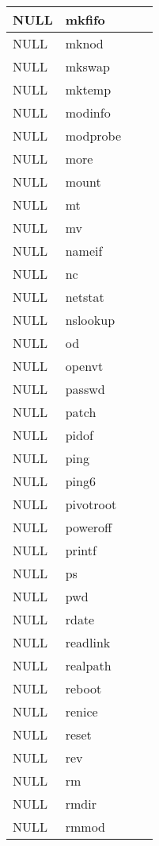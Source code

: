 \begin{longtable}{llp{60mm}p{60mm}}
     \hline
      NULL& mkfifo \\
     \hline
      NULL& mknod \\
     \hline
      NULL& mkswap \\
     \hline
      NULL& mktemp \\
     \hline
      NULL& modinfo \\
     \hline
      NULL& modprobe \\
     \hline
      NULL& more \\
     \hline
      NULL& mount \\
     \hline
      NULL& mt \\
     \hline
      NULL& mv \\
     \hline
      NULL& nameif \\
     \hline
      NULL& nc \\
     \hline
      NULL& netstat \\
     \hline
      NULL& nslookup \\
     \hline
      NULL& od \\
     \hline
      NULL& openvt \\
     \hline
      NULL& passwd \\
     \hline
      NULL& patch \\
     \hline
      NULL& pidof \\
     \hline
      NULL& ping \\
     \hline
      NULL& ping6 \\
     \hline
      NULL& pivotroot \\
     \hline
      NULL& poweroff \\
     \hline
      NULL& printf \\
     \hline
      NULL& ps \\
     \hline
      NULL& pwd \\
     \hline
      NULL& rdate \\
     \hline
      NULL& readlink \\
     \hline
      NULL& realpath \\
     \hline
      NULL& reboot \\
     \hline
      NULL& renice \\
     \hline
      NULL& reset \\
     \hline
      NULL& rev \\
     \hline
      NULL& rm \\
     \hline
      NULL& rmdir \\
     \hline
      NULL& rmmod \\

\end{longtable}
